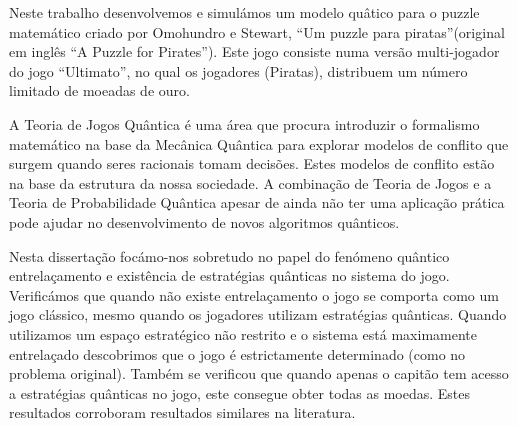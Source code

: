 \begin{resumo}

Neste trabalho desenvolvemos e simul\'{a}mos um modelo qu\^{a}tico para o puzzle matem\'{a}tico criado por Omohundro e Stewart, ``Um puzzle para piratas''(original em ingl\^{e}s ``A Puzzle for Pirates''). Este jogo consiste numa vers\~{a}o multi-jogador do jogo ``Ultimato'', no qual os jogadores (Piratas), distribuem um n\'{u}mero limitado de moeadas de ouro.

A Teoria de Jogos Qu\^{a}ntica \'{e} uma \'{a}rea que procura introduzir o formalismo matem\'{a}tico na base da Mec\^{a}nica Qu\^{a}ntica para explorar modelos de conflito que surgem quando seres racionais tomam decis\~{o}es. Estes modelos de conflito est\~{a}o na base da estrutura da nossa sociedade. A combina\c{c}\~{a}o de Teoria de Jogos e a Teoria de Probabilidade Qu\^{a}ntica apesar de ainda n\~{a}o ter uma aplica\c{c}\~{a}o pr\'{a}tica pode ajudar no desenvolvimento de novos algoritmos qu\^{a}nticos. 

Nesta disserta\c{c}\~{a}o foc\'{a}mo-nos sobretudo no papel do fen\'{o}meno qu\^{a}ntico entrela\c{c}amento e exist\^{e}ncia de estrat\'{e}gias qu\^{a}nticas no sistema do jogo. Verific\'{a}mos que quando n\~{a}o existe entrela\c{c}amento o jogo se comporta como um jogo cl\'{a}ssico, mesmo quando os jogadores utilizam estrat\'{e}gias qu\^{a}nticas. Quando utilizamos um espa\c{c}o estrat\'{e}gico n\~{a}o restrito e o sistema est\'{a} maximamente entrela\c{c}ado descobrimos que o jogo \'{e} estrictamente determinado (como no problema original). Tamb\'{e}m se verificou que quando apenas o capit\~{a}o tem acesso a estrat\'{e}gias qu\^{a}nticas no jogo, este consegue obter todas as moedas. Estes resultados corroboram resultados similares na literatura.



\end{resumo}